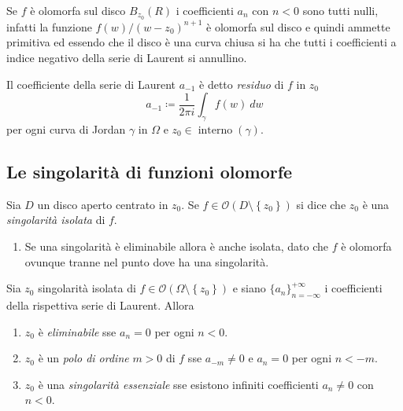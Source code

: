\begin{remark}
  Se $f$ è olomorfa sul disco $B_{z_0}(R)$ i coefficienti $a_n$ con $n < 0$ sono
  tutti nulli, infatti la funzione $f(w) / (w-z_0)^{n+1}$ è olomorfa sul disco
  e quindi ammette primitiva ed essendo che il disco è una curva chiusa si ha
  che tutti i coefficienti a indice negativo della serie di Laurent si
  annullino.
  \label{rmk:coefficienti_negativi}
\end{remark}

\begin{definition}
  Il coefficiente della serie di Laurent $a_{-1}$ è detto \emph{residuo} di $f$
  in $z_0$ 
  \begin{equation*}
    a_{-1} \coloneqq \frac{1}{2\pi i} \int_{\gamma} f(w)\ dw
  \end{equation*}
  per ogni curva di Jordan $\gamma$ in $\Omega$ e $z_0 \in
  \operatorname{interno}(\gamma)$.
  \label{def:residuo}
\end{definition}

\subsection{\textcolor{AnComp}{\textbf{Le singolarità di funzioni olomorfe}}}

\begin{definition}
  Sia $D$ un disco aperto centrato in $z_0$. Se $f \in \mathcal{O}(D \setminus
  \left\{ z_0 \right\})$ si dice che $z_0$ è una \emph{singolarità isolata} di
  $f$.
  \label{def:singolarità_isolata}
\end{definition}

\begin{example}
  \begin{enumerate}
    \item Se una singolarità è eliminabile allora è anche isolata, dato che $f$
      è olomorfa ovunque tranne nel punto dove ha una singolarità.
  \end{enumerate}
\end{example}

\begin{definition}
  Sia $z_0$ singolarità isolata di $f \in \mathcal{O}(\Omega \setminus \left\{
  z_0 \right\})$ e siano $\{a_n\}_{n=-\infty}^{+\infty}$ i coefficienti della
  rispettiva serie di Laurent. Allora
  \begin{enumerate}
    \item $z_0$ è \emph{eliminabile} sse $a_n = 0$ per ogni $n < 0$.
    \item $z_0$ è un \emph{polo di ordine} $m > 0$ di $f$ sse $a_{-m} \neq 0$ e $a_n
      = 0$ per ogni $n < -m$.
    \item $z_0$ è una \emph{singolarità essenziale} sse esistono infiniti coefficienti
      $a_n \neq 0$ con $n < 0$.
  \end{enumerate}
  \label{def:classificazione_singolarita_per_serie_di_laurent}
\end{definition}

